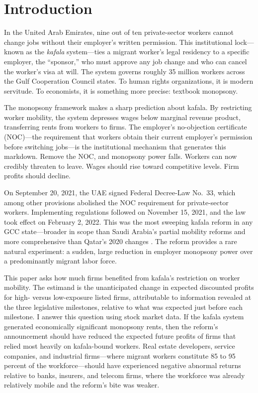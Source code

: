 \documentclass[12pt]{article}
\begin{document}

\section{Introduction}\label{sec:introduction}

In the United Arab Emirates, nine out of ten private-sector workers cannot change jobs without their employer's written permission. This institutional lock---known as the \emph{kafala} system---ties a migrant worker's legal residency to a specific employer, the ``sponsor,'' who must approve any job change and who can cancel the worker's visa at will. The system governs roughly 35 million workers across the Gulf Cooperation Council states. To human rights organizations, it is modern servitude. To economists, it is something more precise: textbook monopsony.

The monopsony framework \citep{robinson1933economics, manning2003monopsony} makes a sharp prediction about kafala. By restricting worker mobility, the system depresses wages below marginal revenue product, transferring rents from workers to firms. The employer's no-objection certificate (NOC)---the requirement that workers obtain their current employer's permission before switching jobs---is the institutional mechanism that generates this markdown. Remove the NOC, and monopsony power falls. Workers can now credibly threaten to leave. Wages should rise toward competitive levels. Firm profits should decline.

On September 20, 2021, the UAE signed Federal Decree-Law No.~33, which among other provisions abolished the NOC requirement for private-sector workers. Implementing regulations followed on November 15, 2021, and the law took effect on February 2, 2022. This was the most sweeping kafala reform in any GCC state---broader in scope than Saudi Arabia's partial mobility reforms and more comprehensive than Qatar's 2020 changes \citep{ilo2020qatar}. The reform provides a rare natural experiment: a sudden, large reduction in employer monopsony power over a predominantly migrant labor force.

This paper asks how much firms benefited from kafala's restriction on worker mobility. The estimand is the unanticipated change in expected discounted profits for high- versus low-exposure listed firms, attributable to information revealed at the three legislative milestones, relative to what was expected just before each milestone. I answer this question using stock market data. If the kafala system generated economically significant monopsony rents, then the reform's announcement should have reduced the expected future profits of firms that relied most heavily on kafala-bound workers. Real estate developers, service companies, and industrial firms---where migrant workers constitute 85 to 95 percent of the workforce---should have experienced negative abnormal returns relative to banks, insurers, and telecom firms, where the workforce was already relatively mobile and the reform's bite was weaker.
\end{document}
